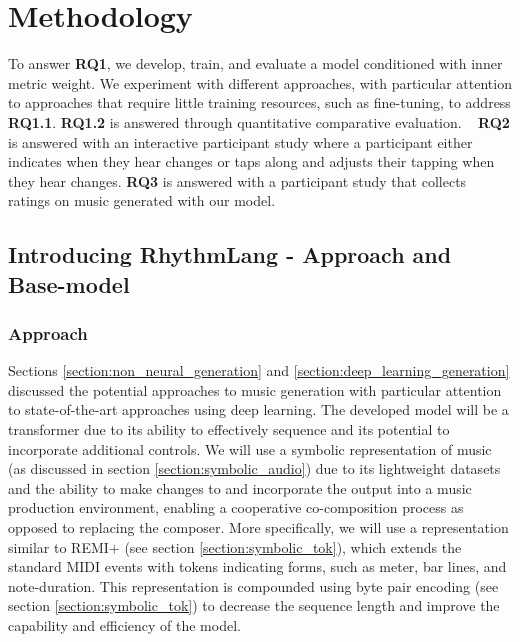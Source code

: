 \chapter{Methodology}
To answer \textbf{RQ1}, we develop, train, and evaluate a model conditioned with inner metric weight. We experiment with different approaches, with particular attention to approaches that require little training resources, such as fine-tuning, to address \textbf{RQ1.1}. \textbf{RQ1.2} is answered through quantitative comparative evaluation.   
\textbf{RQ2} is answered with an interactive participant study where a participant either indicates when they hear changes or taps along and adjusts their tapping when they hear changes. \textbf{RQ3} is answered with a participant study that collects ratings on music generated with our model. 

\section{Introducing RhythmLang - Approach and Base-model}

\subsection{Approach}
Sections \ref{section:non_neural_generation} and \ref{section:deep_learning_generation} discussed the potential approaches to music generation with particular attention to state-of-the-art approaches using deep learning. The developed model will be a transformer due to its ability to effectively sequence and its potential to incorporate additional controls. We will use a symbolic representation of music (as discussed in section \ref{section:symbolic_audio}) due to its lightweight datasets and the ability to make changes to and incorporate the output into a music production environment, enabling a cooperative co-composition process as opposed to replacing the composer. More specifically, we will use a representation similar to REMI+ (see section \ref{section:symbolic_tok}), which extends the standard MIDI events with tokens indicating forms, such as meter, bar lines, and note-duration. This representation is compounded using byte pair encoding (see section \ref{section:symbolic_tok}) to decrease the sequence length and improve the capability and efficiency of the model. \\ 

